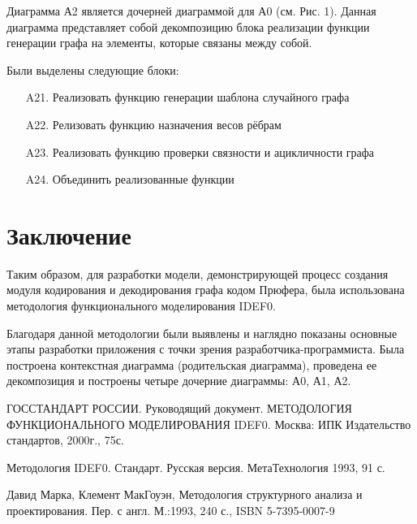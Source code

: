 \documentclass[a4paper, final]{article}
\begin{document}
Диаграмма А2 является дочерней диаграммой для А0 (см. Рис. 1). Данная диаграмма представляет собой декомпозицию
блока реализации функции генерации графа на элементы, которые связаны между собой. 

Были выделены следующие блоки:
\begin{itemize}
	\item[A21.] Реализовать функцию генерации шаблона случайного графа
	\item[A22.] Релизовать функцию назначения весов рёбрам
	\item[A23.] Реализовать функцию проверки связности и ацикличности графа
	\item[A24.] Объединить реализованные функции
\end{itemize} 

\newpage
\hypertarget{img:A2}{}



\cleardoublepage
{}
\newpage
{}
\section*{Заключение}
Таким образом, для разработки модели, демонстрирующей процесс создания модуля кодирования и декодирования графа кодом Прюфера,
была использована методология функционального моделирования IDEF0.

Благодаря данной методологии были выявлены и наглядно показаны основные этапы разработки приложения с точки зрения 
разработчика-программиста. Была построена контекстная диаграмма (родительская диаграмма), проведена ее декомпозиция и 
построены четыре дочерние диаграммы: А0, А1, А2. 

\cleardoublepage
{}
\newpage
\begin{thebibliography}{0}
	ГОССТАНДАРТ РОССИИ. Руководящий документ. МЕТОДОЛОГИЯ ФУНКЦИОНАЛЬНОГО МОДЕЛИРОВАНИЯ IDEF0. 
	Москва: ИПК Издательство стандартов, 2000г., 75с.

	Методология IDEF0. Стандарт. Русская версия. МетаТехнология 1993, 91 с.

  Давид Марка, Клемент МакГоуэн, Методология структурного анализа и проектирования. Пер. с англ. М.:1993, 240 с., ISBN 5-7395-0007-9
\end{thebibliography}
\end{document}
